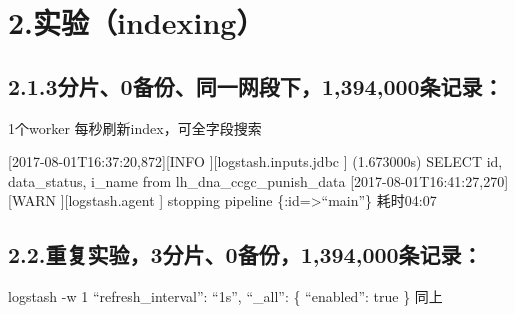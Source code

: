 \documentclass{article}
\begin{document}
\section{2.\hspace*{0.5em}实验（indexing）}\label{sec-indexing}%

\subsection{2.1.\hspace*{0.5em}3分片、0备份、同一网段下，1,394,000条记录：}\label{sec-301394000}%

\noindent{} 1个worker           \mdbr
{} 每秒刷新index，可全字段搜索%

[2017-08-01T16:37:20,872][INFO ][logstash.inputs.jdbc     ] (1.673000s) SELECT id, data\_status, i\_name from lh\_dna\_ccgc\_punish\_data               \mdbr
{}[2017-08-01T16:41:27,270][WARN ][logstash.agent           ] stopping pipeline \{:id=\textgreater{}\textquotedblleft{}main\textquotedblright{}\}                 \mdbr
{}耗时04:07           %

\subsection{2.2.\hspace*{0.5em}重复实验，3分片、0备份，1,394,000条记录：}\label{sec-301394000}%

\noindent{}logstash -w 1
\textquotedblleft{}refresh\_interval\textquotedblright{}: \textquotedblleft{}1s\textquotedblright{}, \textquotedblleft{}\_all\textquotedblright{}: \{ \textquotedblleft{}enabled\textquotedblright{}: true \} 同上         %
\end{document}
